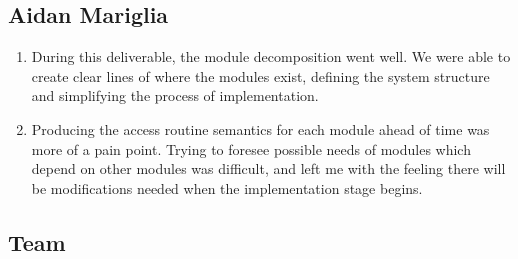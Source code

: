 \documentclass[12pt, titlepage]{article}
\begin{document}
\subsection*{Aidan Mariglia}

\begin{enumerate}
    \item During this deliverable, the module decomposition went well. We were able to create clear lines of where the modules exist, defining the system structure and simplifying the process of implementation.
    
    \item Producing the access routine semantics for each module ahead of time was more of a pain point. Trying to foresee possible needs of modules which depend on other modules was difficult, and left me with the feeling there will be modifications needed when the implementation stage begins. 
\end{enumerate}

\subsection*{Team} 
\end{document}

